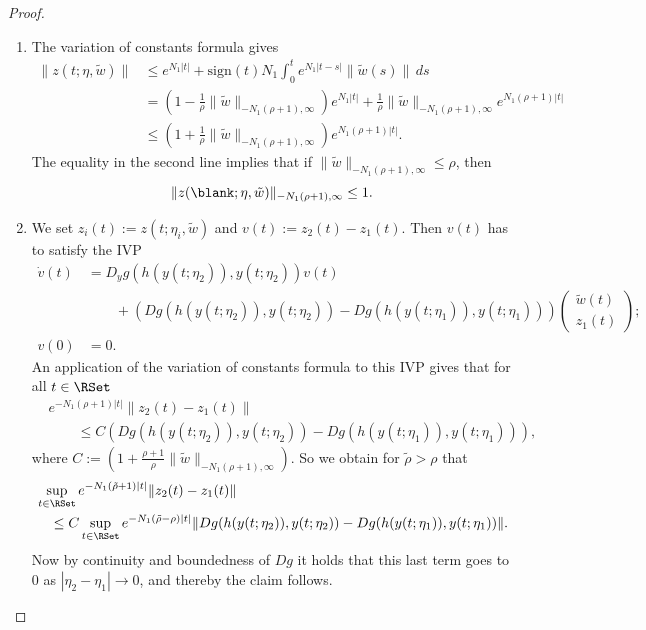 \documentclass[a4paper]{siamart190516}
\newcommand{\sgn}{\text{sign}}
\begin{document}
 \begin{proof}
 \begin{enumerate}
 \item The variation of constants formula gives
\begin{align*}
 \|z(t; \eta,\tilde{w})\| &\leq e^{N_1|t|} +  \sgn(t) N_1  \int_0^t e^{N_1|t-s|} \|\tilde{w}(s)\| \, ds \\
 &= \left(1-\frac{1}{\rho} \|\tilde{w}\|_{-N_1 (\rho+1), \infty} \right) e^{N_1|t|} + \frac{1}{\rho} \|\tilde{w}\|_{-N_1 (\rho+1), \infty} e^{N_1(\rho+1)|t|} \\
 &\leq \left( 1 + \frac{1}{\rho}  \|\tilde{w}\|_{-N_1 (\rho+1), \infty}  \right)  e^{N_1(\rho+1)|t|}.
\end{align*}
The equality in the second line implies that if $ \|\tilde{w}\|_{-N_1 (\rho+1), \infty} \leq \rho$, then
\[
 \|z(\blank; \eta,\tilde{w})\|_{-N_1 (\rho+1), \infty} \leq 1.
\]

\item We set $z_i(t) := z(t; \eta_i,\tilde{w})$ and $v(t) := z_2(t) - z_1(t)$. Then $v(t)$ has to satisfy the IVP
\begin{equation*}
\begin{aligned}
\dot{v}(t)  &= D_y g(h(y(t;\eta_2)), y(t;\eta_2)) v(t) \\ 
&\qquad  +  \left( Dg(h(y(t;\eta_2)), y(t;\eta_2)) - Dg(h(y(t;\eta_1)), y(t;\eta_1)) \right)  \begin{pmatrix} \tilde{w}(t) \\ z_1(t) \end{pmatrix}; \\
v(0) &=  0.
 \end{aligned}
 \end{equation*}
An application of the variation of constants formula to this IVP gives that for all $t \in \RSet$
\begin{align*}
&e^{-N_1(\rho+1)|t|} \| z_2(t) -z_1(t) \| \\
&\qquad \leq  C  \left( Dg(h(y(t;\eta_2)), y(t;\eta_2)) - Dg(h(y(t;\eta_1)), y(t;\eta_1)) \right),
\end{align*}
where $C:=(1 + \frac{\rho+1}{\rho} \| \tilde{w} \|_{-N_1 (\rho+1), \infty})$. So we obtain for $\tilde{\rho} > \rho$ that
\begin{align*}
&\sup_{t \in \RSet} e^{-N_1(\tilde{\rho}+1)|t|} \| z_2(t) -z_1(t) \| \\
&\quad \leq C \sup_{t \in \RSet} e^{- N_1(\tilde{\rho} - \rho) |t|} \|Dg(h(y(t;\eta_2)), y(t;\eta_2)) - Dg(h(y(t;\eta_1)), y(t;\eta_1)) \|.
\end{align*}
Now by continuity and boundedness of $Dg$ it holds that this last term goes to $0$ as $|\eta_2 - \eta_1| \rightarrow 0$, and thereby the claim follows. 



\end{enumerate}
\end{proof}
\end{document}
